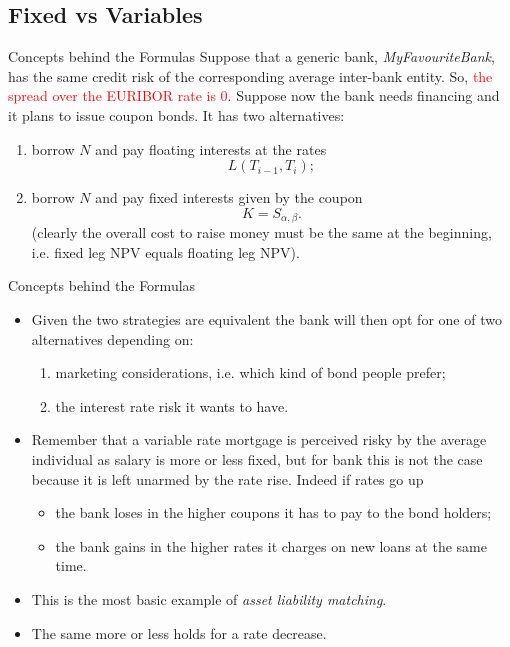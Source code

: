 \documentclass{beamer}
\begin{document}
\subsection{Fixed vs Variables}
\begin{frame}{Concepts behind the Formulas}
	Suppose that a generic bank, \emph{MyFavouriteBank}, has the same credit risk of the corresponding average inter-bank entity. So, \textcolor{red}{the spread over the EURIBOR rate is 0}. Suppose now the bank needs financing and it plans to issue coupon bonds. It has two alternatives:
	\begin{enumerate}
		\item<1-> borrow $N$ and pay floating interests at the rates
		\begin{equation*}
			L(T_{i-1},T_i);
		\end{equation*}
		\item<1-> borrow $N$ and pay fixed interests given by the coupon
		\begin{equation*}
			K = S_{\alpha,\beta}.
		\end{equation*}
		(clearly the overall cost to raise money must be the same at the beginning, i.e. fixed leg NPV equals floating leg NPV).
	\end{enumerate}
\end{frame}

\begin{frame}{Concepts behind the Formulas}
	\begin{itemize}
		\item<1-> Given the two strategies are equivalent the bank will then opt for one of two alternatives depending on:
		\begin{enumerate}
			\item marketing considerations, i.e. which kind of bond people prefer;
			\item the interest rate risk it wants to have.
		\end{enumerate} 
		\item<2-> Remember that a variable rate mortgage is perceived risky by the average individual as salary is more or less fixed, but for bank this is not the case because it is left unarmed by the rate rise. Indeed if rates go up
		\begin{itemize}
			\item the bank loses in the higher coupons it has to pay to the bond holders;
			\item the bank gains in the higher rates it charges on new loans at the same time.
		\end{itemize}
		\item<3-> This is the most basic example of \emph{asset liability matching}.
		\item<3-> The same more or less holds for a rate decrease.%
	\end{itemize}
\end{frame}
\end{document}
